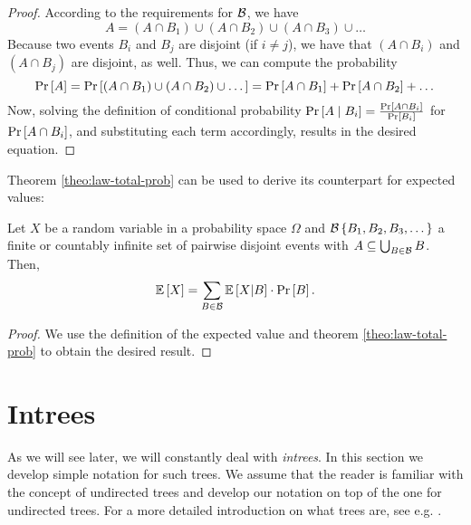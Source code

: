 \begin{proof}
  According to the requirements for ${\cal B}$, we have
  \begin{equation*}
    A = 
    \left( A\cap B_1 \right) \cup
    \left( A\cap B_2 \right) \cup
    \left( A\cap B_3 \right) \cup
    \dots
  \end{equation*}
  Because two events $B_i$ and $B_j$ are disjoint (if $i\neq j$), we have that $\left( A\cap B_i \right)$ and $\left( A\cap B_j \right)$ are disjoint, as well. Thus, we can compute the probability
  \begin{equation*}
    \operatorname{Pr}\left[A\right] = 
    \operatorname{Pr}\left[
      \left( A\cap B_1 \right) \cup
      \left( A\cap B_2 \right) \cup
      \dots
    \right]
    =
    \operatorname{Pr}\left[ A\cap B_1\right] +
    \operatorname{Pr}\left[ A\cap B_2\right] + \dots
  \end{equation*}
  Now, solving the definition of conditional probability $\operatorname{Pr}\left[A\mid B_i\right] = \frac{\operatorname{Pr}\left[A \cap B_i\right]}{\operatorname{Pr}\left[B_i\right]}$ for $\operatorname{Pr}\left[A\cap B_i\right]$, and substituting each term accordingly, results in the desired equation.
\end{proof}

Theorem \ref{theo:law-total-prob} can be used to derive its counterpart for expected values:

\begin{theorem}
  \label{theo:law-total-expectation}
  Let $X$ be a random variable in a probability space $\Omega$ and ${\cal B}\left\{ B_1,B_2,B_3,\dots \right\}$ a finite or countably infinite set of pairwise disjoint events with $A \subseteq \bigcup_{B \in {\cal B}} B$. Then,
  \begin{equation*}
    \mathbb{E}\left[ X \right] = \sum_{B\in{\cal B}} \mathbb{E}\left[ X | B \right] \cdot \operatorname{Pr}\left[B\right].
  \end{equation*}
\end{theorem}

\begin{proof}
  We use the definition of the expected value and theorem \ref{theo:law-total-prob} to obtain the desired result.
\end{proof}

\section{Intrees}
\label{sec:foundations-graph-theory}

As we will see later, we will constantly deal with \emph{intrees}. In this section we develop simple notation for such trees. We assume that the reader is familiar with the concept of undirected trees and develop our notation on top of the one for undirected trees. For a more detailed introduction on what trees are, see e.g. \cite{diestel2005graph}.

